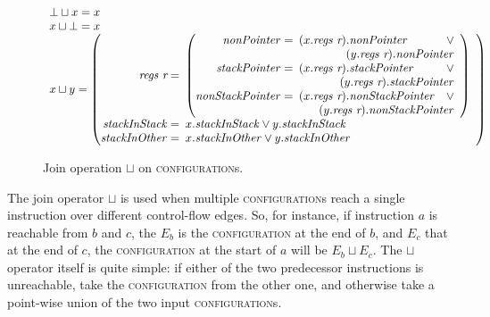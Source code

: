 \begin{figure}
  \begin{displaymath}
    \begin{array}{l}
    \bot \sqcup x    = x \\
    x    \sqcup \bot = x \\
    x    \sqcup y    = \left(\begin{array}{rl}
      \textit{regs r} = &\!\!\! \left(\begin{array}{rll}
        \mathit{nonPointer} = &\!\!\! (x.\textit{regs r}).\mathit{nonPointer} & \vee \\
                              & \multicolumn{2}{r}{(y.\textit{regs r}).\mathit{nonPointer}} \\
        \mathit{stackPointer} = &\!\!\!(x.\textit{regs r}).\mathit{stackPointer} & \vee \\
                                & \multicolumn{2}{r}{(y.\textit{regs r}).\mathit{stackPointer}} \\
        \!\!\!\mathit{nonStackPointer} = &\!\!\! (x.\textit{regs r}).\mathit{nonStackPointer} & \vee \\
                                   & \multicolumn{2}{r}{(y.\textit{regs r}).\mathit{nonStackPointer}}
        \end{array}\right)\\
      \!\!\!\mathit{stackInStack} = &\!\!\! x.\mathit{stackInStack} \vee y.\mathit{stackInStack} \\
      \!\!\!\mathit{stackInOther} = &\!\!\! x.\mathit{stackInOther} \vee y.\mathit{stackInOther}
    \end{array}\right)
    \end{array}
  \end{displaymath}
  \caption{Join operation $\sqcup$ on \textsc{configuration}s.}
  \label{fig:static_alias:join_op}
\end{figure}

The join operator $\sqcup$ is used when multiple
\textsc{configuration}s reach a single instruction over different
control-flow edges.  So, for instance, if instruction $a$ is reachable
from $b$ and $c$, the $E_b$ is the \textsc{configuration} at the end
of $b$, and $E_c$ that at the end of $c$, the \textsc{configuration}
at the start of $a$ will be $E_b \sqcup E_c$.  The $\sqcup$ operator
itself is quite simple: if either of the two predecessor instructions
is unreachable, take the \textsc{configuration} from the other one,
and otherwise take a point-wise union of the two input
\textsc{configuration}s.

